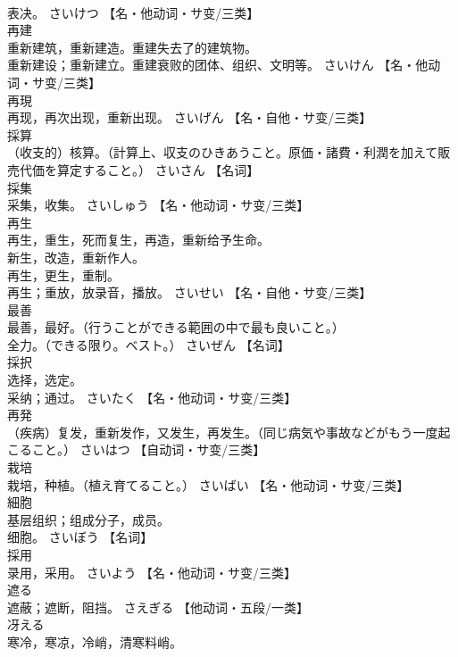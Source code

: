 \documentclass[8pt]{extreport}
\begin{document}
\begin{CJK}{UTF8}{min}
\\	表决。	さいけつ		【名・他动词・サ变/三类】
\\	再建	
\\	重新建筑，重新建造。重建失去了的建筑物。 
\\	重新建设；重新建立。重建衰败的团体、组织、文明等。	さいけん		【名・他动词・サ变/三类】
\\	再現	
\\	再现，再次出现，重新出现。	さいげん		【名・自他・サ变/三类】
\\	採算	
\\	（收支的）核算。（計算上、収支のひきあうこと。原価・諸費・利潤を加えて販売代価を算定すること。）	さいさん		【名词】
\\	採集	
\\	采集，收集。	さいしゅう		【名・他动词・サ变/三类】
\\	再生	
\\	再生，重生，死而复生，再造，重新给予生命。 
\\	新生，改造，重新作人。 
\\	再生，更生，重制。 
\\	再生；重放，放录音，播放。	さいせい		【名・自他・サ变/三类】
\\	最善	
\\	最善，最好。（行うことができる範囲の中で最も良いこと。） 
\\	全力。（できる限り。ベスト。）	さいぜん		【名词】
\\	採択	
\\	选择，选定。 
\\	采纳；通过。	さいたく		【名・他动词・サ变/三类】
\\	再発	
\\	（疾病）复发，重新发作，又发生，再发生。（同じ病気や事故などがもう一度起こること。）	さいはつ		【自动词・サ变/三类】
\\	栽培	
\\	栽培，种植。（植え育てること。）	さいばい		【名・他动词・サ变/三类】
\\	細胞	
\\	基层组织；组成分子，成员。 
\\	细胞。	さいぼう		【名词】
\\	採用	
\\	录用，采用。	さいよう		【名・他动词・サ变/三类】
\\	遮る	
\\	遮蔽；遮断，阻挡。	さえぎる		【他动词・五段/一类】
\\	冴える	
\\	寒冷，寒凉，冷峭，清寒料峭。 

\end{CJK}
\end{document}
